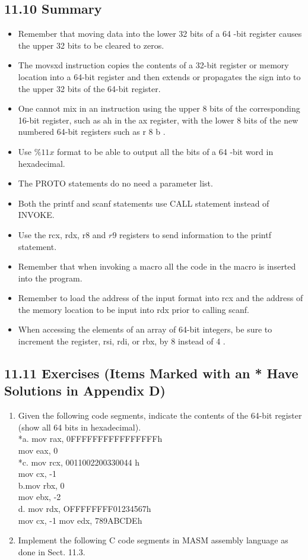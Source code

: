 \documentclass[10pt]{article}
\begin{document}
\subsection*{11.10 Summary}
\begin{itemize}
  \item Remember that moving data into the lower 32 bits of a 64 -bit register causes the upper 32 bits to be cleared to zeros.
  \item The movsxd instruction copies the contents of a 32-bit register or memory location into a 64-bit register and then extends or propagates the sign into to the upper 32 bits of the 64-bit register.
  \item One cannot mix in an instruction using the upper 8 bits of the corresponding 16-bit register, such as ah in the ax register, with the lower 8 bits of the new numbered 64-bit registers such as r 8 b .
  \item Use $\% 11 x$ format to be able to output all the bits of a 64 -bit word in hexadecimal.
  \item The PROTO statements do no need a parameter list.
  \item Both the printf and scanf statements use CALL statement instead of INVOKE.
  \item Use the rcx, rdx, r8 and $r 9$ registers to send information to the printf statement.
  \item Remember that when invoking a macro all the code in the macro is inserted into the program.
  \item Remember to load the address of the input format into rcx and the address of the memory location to be input into rdx prior to calling scanf.
  \item When accessing the elements of an array of 64-bit integers, be sure to increment the register, rsi, rdi, or rbx, by 8 instead of 4 .
\end{itemize}

\subsection*{11.11 Exercises (Items Marked with an * Have Solutions in Appendix D)}
\begin{enumerate}
  \item Given the following code segments, indicate the contents of the 64-bit register (show all 64 bits in hexadecimal).\\
*a. mov rax, 0FFFFFFFFFFFFFFFFh\\
mov eax, 0\\
*c. mov rcx, 0011002200330044 h\\
mov cx, -1\\
b.mov rbx, 0\\
mov ebx, -2\\
d. mov rdx, OFFFFFFFF01234567h\\
mov cx, -1 mov edx, 789ABCDEh
  \item Implement the following C code segments in MASM assembly language as done in Sect. 11.3.
\end{enumerate}
\end{document}
